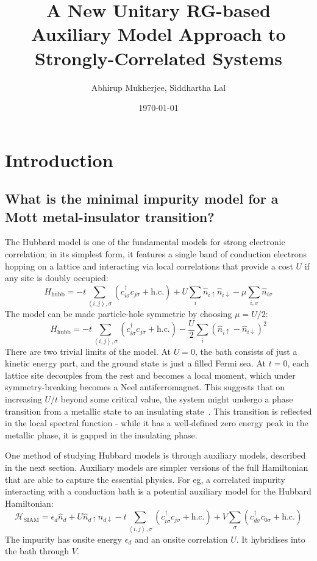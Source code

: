 \documentclass[10pt]{report}
\title{A New Unitary RG-based Auxiliary Model Approach to Strongly-Correlated Systems}
\author{Abhirup Mukherjee, Siddhartha Lal}
\affil{Indian Institute of Science Education and Research Kolkata, Mohanpur}
\date{\today}
\numberwithin{equation}{section}
\begin{document}
\maketitle
\tableofcontents
\newpage
\chapter{Introduction}

\section{What is the minimal impurity model for a Mott metal-insulator transition?}
The Hubbard model is one of the fundamental models for strong electronic correlation; in its simplest form, it features a single band of conduction electrons hopping on a lattice and interacting via local correlations that provide a cost \(U\) if any site is doubly occupied:
\[H_\text{hubb} = -t\sum_{\left<i,j \right>,\sigma}\left(c^\dagger_{i\sigma}c_{j\sigma}+\text{h.c.}\right) + U\sum_i \hat n_{i \uparrow} \hat n_{i \downarrow} - \mu \sum_{i,\sigma}\hat n_{i\sigma}\]
The model can be made particle-hole symmetric by choosing \(\mu = U/2\):
\[H_\text{hubb} = -t\sum_{\left<i,j \right>,\sigma}\left(c^\dagger_{i\sigma}c_{j\sigma}+\text{h.c.}\right) - \frac{U}{2}\sum_i \left(\hat n_{i \uparrow} - \hat n_{i \downarrow}\right)^2\]
There are two trivial limits of the model. At \(U=0\), the bath consists of just a kinetic energy part, and the ground state is just a filled Fermi sea. At \(t=0\), each lattice site decouples from the rest and becomes a local moment, which under symmetry-breaking becomes a Neel antiferromagnet. This suggests that on increasing \(U/t\) beyond some critical value, the system might undergo a phase transition from a metallic state to an insulating state~\cite{Mott_1949}. This transition is reflected in the local spectral function - while it has a well-defined zero energy peak in the metallic phase, it is gapped in the insulating phase.

One method of studying Hubbard models is through auxiliary models, described in the next section. Auxiliary models are simpler versions of the full Hamiltonian that are able to capture the essential physics. For eg, a correlated impurity interacting with a conduction bath is a potential auxiliary model for the Hubbard Hamiltonian:
\begin{equation}
\label{clus_bath_siam}
\mathcal{H}_\text{SIAM} = \epsilon_d \hat n_d + U \hat n_{d \uparrow} \hat n_{d \downarrow} - t\sum_{\left<i,j \right>, \sigma}\left(c^\dagger_{i\sigma}c_{j\sigma} + \text{h.c.}\right) + V\sum_\sigma \left( c^\dagger_{d\sigma}c_{0\sigma} + \text{h.c.}\right) 
\end{equation}
The impurity has onsite energy \(\epsilon_d\) and an onsite correlation \(U\). It hybridises into the bath through \(V\).
\end{document}

